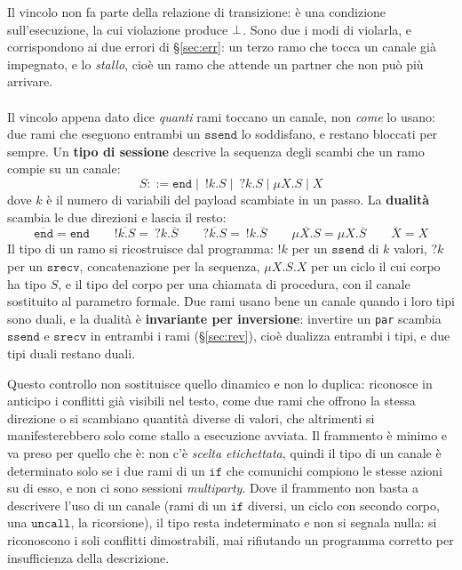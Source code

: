 \medskip
\noindent
Il vincolo non fa parte della relazione di transizione: è una condizione
sull'esecuzione, la cui violazione produce $\bot$. Sono due i modi di violarla, e
corrispondono ai due errori di \S\ref{sec:err}: un terzo ramo che tocca un canale
già impegnato, e lo \emph{stallo}, cioè un ramo che attende un partner che non
può più arrivare.

\paragraph{} Il vincolo appena dato dice \emph{quanti}
rami toccano un canale, non \emph{come} lo usano: due rami che eseguono entrambi
un $\mathtt{ssend}$ lo soddisfano, e restano bloccati per sempre. Un
\textbf{tipo di sessione} descrive la sequenza degli scambi che un ramo compie
su un canale:
\[
S ::= \mathtt{end} \mid\ !k.S \mid\ ?k.S \mid \mu X.S \mid X
\]
dove $k$ è il numero di variabili del payload scambiate in un passo. La \textbf{dualità}
scambia le due direzioni e lascia il resto:
\[
\overline{\mathtt{end}} = \mathtt{end} \qquad
\overline{!k.S} =\ ?k.\overline{S} \qquad
\overline{?k.S} =\ !k.\overline{S} \qquad
\overline{\mu X.S} = \mu X.\overline{S} \qquad
\overline{X} = X
\]
Il tipo di un ramo si ricostruisce dal programma: $!k$ per un $\mathtt{ssend}$ di
$k$ valori, $?k$ per un $\mathtt{srecv}$, concatenazione per la sequenza,
$\mu X.S.X$ per un ciclo il cui corpo ha tipo $S$, e il tipo del corpo per una
chiamata di procedura, con il canale sostituito al parametro formale. Due rami
usano bene un canale quando i loro tipi sono duali, e la dualità è
\textbf{invariante per inversione}: invertire un \texttt{par} scambia
$\mathtt{ssend}$ e $\mathtt{srecv}$ in entrambi i rami (\S\ref{sec:rev}), cioè
dualizza entrambi i tipi, e due tipi duali restano duali.

\medskip
\noindent
Questo controllo non sostituisce quello dinamico e non lo duplica: riconosce in
anticipo i conflitti già visibili nel testo, come due rami che offrono la stessa
direzione o si scambiano quantità diverse di valori, che altrimenti si
manifesterebbero solo come stallo a esecuzione avviata. Il frammento è minimo e va preso per quello
che è: non c'è \emph{scelta etichettata}, quindi il tipo di un canale è
determinato solo se i due rami di un $\mathtt{if}$ che comunichi compiono le
stesse azioni su di esso, e non ci sono sessioni \emph{multiparty}. Dove il
frammento non basta a descrivere l'uso di un canale (rami di un $\mathtt{if}$
diversi, un ciclo con secondo corpo, una $\mathtt{uncall}$, la ricorsione), il
tipo resta indeterminato e non si segnala nulla: si riconoscono i soli
conflitti dimostrabili, mai rifiutando un programma corretto per insufficienza
della descrizione.


